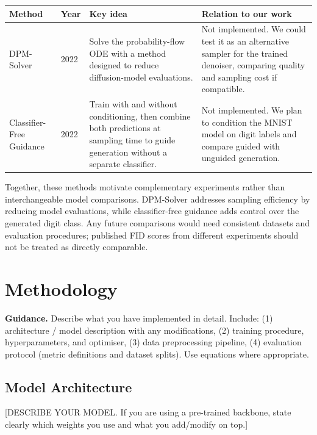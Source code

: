 \documentclass[11pt, letterpaper]{article}
\begin{document}
\begin{center}
\begin{tabular}{llp{4.5cm}p{5cm}}
\toprule
\textbf{Method} & \textbf{Year} & \textbf{Key idea} & \textbf{Relation to our work} \\
\midrule
DPM-Solver & 2022 & Solve the probability-flow ODE with a method designed to reduce diffusion-model evaluations. & Not implemented. We could test it as an alternative sampler for the trained denoiser, comparing quality and sampling cost if compatible. \\
\midrule
Classifier-Free Guidance & 2022 & Train with and without conditioning, then combine both predictions at sampling time to guide generation without a separate classifier. & Not implemented. We plan to condition the MNIST model on digit labels and compare guided with unguided generation. \\
\bottomrule
\end{tabular}
\end{center}

Together, these methods motivate complementary experiments rather than interchangeable model comparisons. DPM-Solver addresses sampling efficiency by reducing model evaluations, while classifier-free guidance adds control over the generated digit class. Any future comparisons would need consistent datasets and evaluation procedures; published FID scores from different experiments should not be treated as directly comparable.



\section{Methodology}

\begin{guidancebox}
\textbf{Guidance.} Describe what you have implemented in detail. Include:
(1) architecture / model description with any modifications,
(2) training procedure, hyperparameters, and optimiser,
(3) data preprocessing pipeline,
(4) evaluation protocol (metric definitions and dataset splits).
Use equations where appropriate.
\end{guidancebox}

\subsection{Model Architecture}

[DESCRIBE YOUR MODEL. If you are using a pre-trained backbone, state clearly
which weights you use and what you add/modify on top.]
\end{document}
